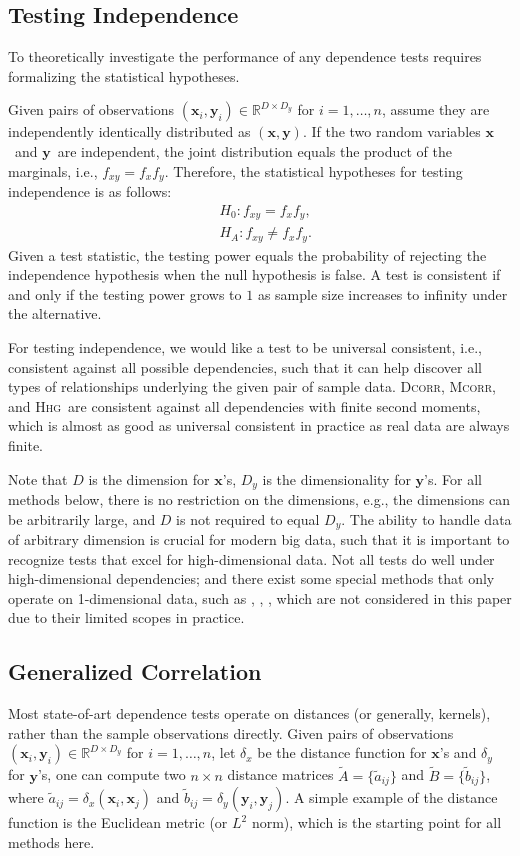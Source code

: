 \documentclass[11pt]{article}
\providecommand{\sct}[1]{{\normalfont\textsc{#1}}}
\providecommand{\mb}[1]{\boldsymbol{#1}}
\newcommand{\Real}{\mathbb{R}}
\newcommand{\Hhg}{\sct{Hhg}}
\newcommand{\Dcorr}{\sct{Dcorr}}
\newcommand{\Mcorr}{\sct{Mcorr}}
\newcommand{\mbx}{\ensuremath{\mb{x}}}
\newcommand{\mby}{\ensuremath{\mb{y}}}
\begin{document}
\subsection{Testing Independence}
To theoretically investigate the performance of any dependence tests requires formalizing the statistical hypotheses.
 
Given pairs of observations $(\mb{x}_{i},\mb{y}_{i}) \in \Real^{D \times D_y}$ for $i=1,\ldots,n$, assume they are independently identically distributed as $(\mbx,\mby)$. If the two random variables \mbx~and \mby~are independent, the joint distribution equals the product of the marginals, i.e., $f_{xy}=f_x f_y$.  Therefore, the statistical hypotheses for testing independence is as follows:
\begin{align*}
& H_{0}: f_{xy}=f_{x}f_{y},\\
& H_{A}: f_{xy} \neq f_{x}f_{y}.
\end{align*}
Given a test statistic, the testing power equals the probability of rejecting the independence hypothesis when the null hypothesis is false. A test is consistent if and only if the testing power grows to $1$ as sample size increases to infinity under the alternative. 

For testing independence, we would like a test to be universal consistent, i.e., consistent against all possible dependencies, such that it can help discover all types of relationships underlying the given pair of sample data. \Dcorr, \Mcorr, and \Hhg~are consistent against all dependencies with finite second moments, which is almost as good as universal consistent in practice as real data are always finite.

Note that $D$ is the dimension for $\mb{x}$'s, $D_y$ is the dimensionality for $\mb{y}$'s. For all methods below, there is no restriction on the dimensions, e.g., the dimensions can be arbitrarily large, and $D$ is not required to equal $D_y$. The ability to handle data of arbitrary dimension is crucial for modern big data, such that it is important to recognize tests that excel for high-dimensional data. Not all tests do well under high-dimensional dependencies; and there exist some special methods that only operate on 1-dimensional data, such as \cite{Reshef2011}, \cite{heller2016consistent}, \cite{Huo2016}, which are not considered in this paper due to their limited scopes in practice.

\subsection{Generalized Correlation}
Most state-of-art dependence tests operate on distances (or generally, kernels), rather than the sample observations directly. Given pairs of observations $(\mb{x}_{i},\mb{y}_{i}) \in \Real^{D \times D_y}$ for $i=1,\ldots,n$, let $\delta_x$ be the distance function for $\mb{x}$'s and $\delta_y$ for $\mb{y}$'s, one can compute two $n \times n$ distance matrices $\tilde{A}=\{\tilde{a}_{ij}\}$ and $\tilde{B}=\{\tilde{b}_{ij}\}$, where $\tilde{a}_{ij}=\delta_x(\mb{x}_i,\mb{x}_j)$ and $\tilde{b}_{ij}=\delta_y(\mb{y}_i,\mb{y}_j)$. A simple example of the distance function is the Euclidean metric (or $L^{2}$ norm), which is the starting point for all methods here.
\end{document}
